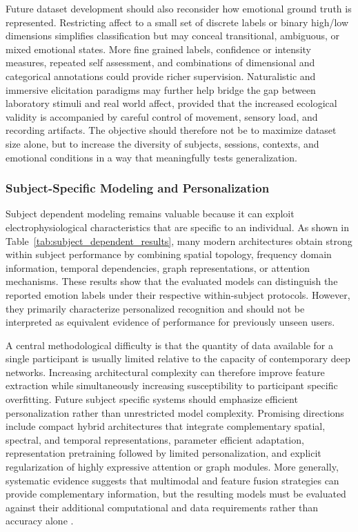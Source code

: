 \documentclass[ASNA,twocolumn]{USG}
\begin{document}
Future dataset development should also reconsider how emotional ground truth is represented. Restricting affect to a small set of discrete labels or binary high/low dimensions simplifies classification but may conceal transitional, ambiguous, or mixed emotional states. More fine grained labels, confidence or intensity measures, repeated self assessment, and combinations of dimensional and categorical annotations could provide richer supervision. Naturalistic and immersive elicitation paradigms may further help bridge the gap between laboratory stimuli and real world affect, provided that the increased ecological validity is accompanied by careful control of movement, sensory load, and recording artifacts. The objective should therefore not be to maximize dataset size alone, but to increase the diversity of subjects, sessions, contexts, and emotional conditions in a way that meaningfully tests generalization.

\subsubsection{Subject-Specific Modeling and Personalization}
\label{subsubsec:subject_specific_challenges}

Subject dependent modeling remains valuable because it can exploit electrophysiological characteristics that are specific to an individual. As shown in Table~\ref{tab:subject_dependent_results}, many modern architectures obtain strong within subject performance by combining spatial topology, frequency domain information, temporal dependencies, graph representations, or attention mechanisms. These results show that the evaluated models can distinguish the reported emotion labels under their respective within-subject protocols. However, they primarily characterize personalized recognition and should not be interpreted as equivalent evidence of performance for previously unseen users.

A central methodological difficulty is that the quantity of data available for a single participant is usually limited relative to the capacity of contemporary deep networks. Increasing architectural complexity can therefore improve feature extraction while simultaneously increasing susceptibility to participant specific overfitting. Future subject specific systems should emphasize efficient personalization rather than unrestricted model complexity. Promising directions include compact hybrid architectures that integrate complementary spatial, spectral, and temporal representations, parameter efficient adaptation, representation pretraining followed by limited personalization, and explicit regularization of highly expressive attention or graph modules. More generally, systematic evidence suggests that multimodal and feature fusion strategies can provide complementary information, but the resulting models must be evaluated against their additional computational and data requirements rather than accuracy alone \cite{khare2024emotion}.
\end{document}
